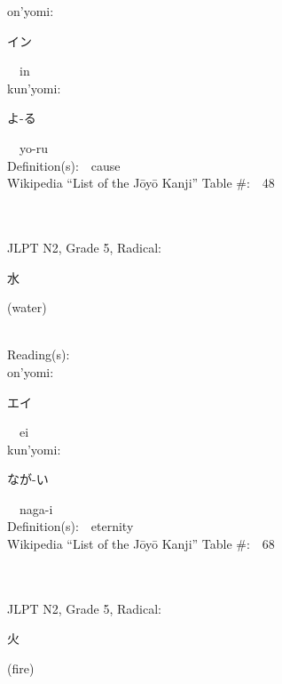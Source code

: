 \begin{multicols}{2}
{\hspace*{1em}}on'yomi:\ \ \\
{\hspace*{2em}}{\begin{CJK}{UTF8}{min} イン \end{CJK}}\ \ in\ \ \\
{\hspace*{1em}}kun'yomi:\ \ \\
{\hspace*{2em}}{\begin{CJK}{UTF8}{min} よ-る \end{CJK}}\ \ yo-ru\ \ \\
Definition(s):\ \ cause \\
Wikipedia ``List of the J\=oy\=o Kanji'' Table \#:\ \ 48 \\
\ \ \\
{\fontsize{34pt}{40pt}  }\ \ \\  %
{JLPT N2, Grade 5, Radical:\ \ {\begin{CJK}{UTF8}{min} 水 \end{CJK}} (water) } \\
Reading(s):\ \ \\
{\hspace*{1em}}on'yomi:\ \ \\
{\hspace*{2em}}{\begin{CJK}{UTF8}{min} エイ \end{CJK}}\ \ ei\ \ \\
{\hspace*{1em}}kun'yomi:\ \ \\
{\hspace*{2em}}{\begin{CJK}{UTF8}{min} なが-い \end{CJK}}\ \ naga-i\ \ \\
Definition(s):\ \ eternity \\
Wikipedia ``List of the J\=oy\=o Kanji'' Table \#:\ \ 68 \\
\ \ \\
{\fontsize{34pt}{40pt}  }\ \ \\  %
{JLPT N2, Grade 5, Radical:\ \ {\begin{CJK}{UTF8}{min} 火 \end{CJK}} (fire) } \\

\end{multicols}
